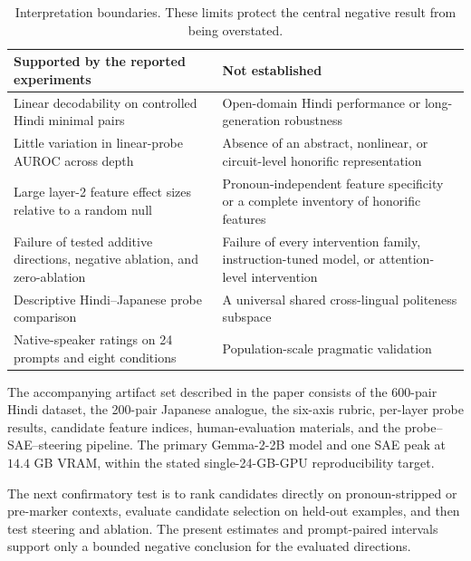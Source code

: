 \documentclass[10pt]{article}
\begin{document}
\begin{table}[H]
\centering
\small
\begin{tabularx}{\textwidth}{X X}
\toprule
\textbf{Supported by the reported experiments} & \textbf{Not established} \\
\midrule
Linear decodability on controlled Hindi minimal pairs & Open-domain Hindi performance or long-generation robustness \\
Little variation in linear-probe AUROC across depth & Absence of an abstract, nonlinear, or circuit-level honorific representation \\
Large layer-2 feature effect sizes relative to a random null & Pronoun-independent feature specificity or a complete inventory of honorific features \\
Failure of tested additive directions, negative ablation, and zero-ablation & Failure of every intervention family, instruction-tuned model, or attention-level intervention \\
Descriptive Hindi--Japanese probe comparison & A universal shared cross-lingual politeness subspace \\
Native-speaker ratings on 24 prompts and eight conditions & Population-scale pragmatic validation \\
\bottomrule
\end{tabularx}
\caption{Interpretation boundaries. These limits protect the central negative
result from being overstated.}
\label{tab:boundaries}
\end{table}

The accompanying artifact set described in the paper consists of the 600-pair
Hindi dataset, the 200-pair Japanese analogue, the six-axis rubric, per-layer
probe results, candidate feature indices, human-evaluation materials, and the
probe--SAE--steering pipeline. The primary Gemma-2-2B model and one SAE peak at
$14.4$ GB VRAM, within the stated single-24-GB-GPU reproducibility target.

The next confirmatory test is to rank candidates directly on pronoun-stripped
or pre-marker contexts, evaluate candidate selection on held-out examples, and
then test steering and ablation. The present estimates and prompt-paired
intervals support only a bounded negative conclusion for the evaluated
directions.
\FloatBarrier

\fi
\end{document}
